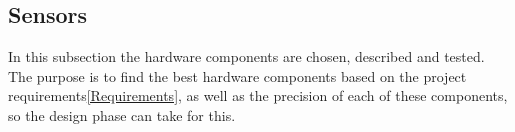 \subsection{Sensors}
In this subsection the hardware components are chosen, described and tested. The purpose is to find the best hardware components based on the project requirements\ref{Requirements}, as well as the precision of each of these components, so the design phase can take  for this. 







